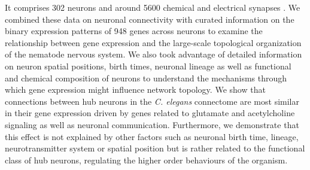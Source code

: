 \documentclass[10pt,letterpaper]{article}
\begin{document}
It comprises 302 neurons and around 5600 chemical and electrical synapses \cite{White:1986tx}.
We combined these data on neuronal connectivity with curated information on the binary expression patterns of 948 genes across neurons to examine the relationship between gene expression and the large-scale topological organization of the nematode nervous system.
We also took advantage of detailed information on neuron spatial positions, birth times, neuronal lineage as well as functional and chemical composition of neurons to understand the mechanisms through which gene expression might influence network topology.
We show that connections between hub neurons in the \textit{C. elegans} connectome are most similar in their gene expression driven by genes related to glutamate and acetylcholine signaling as well as neuronal communication.
Furthermore, we demonstrate that this effect is not explained by other factors such as neuronal birth time, lineage, neurotransmitter system or spatial position but is rather related to the functional class of hub neurons, regulating the higher order behaviours of the organism.

\end{document}
